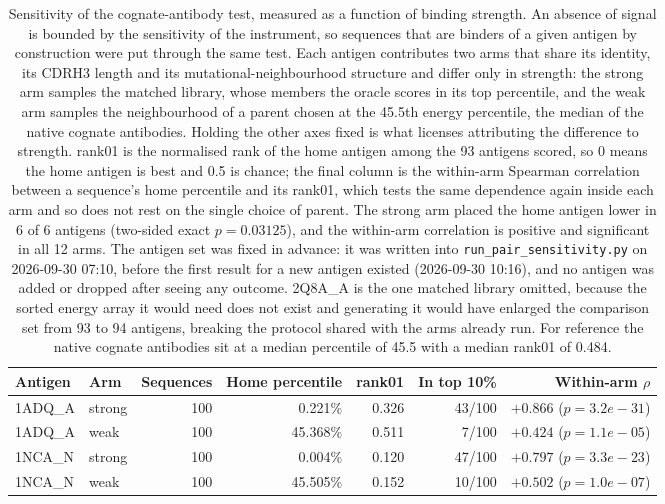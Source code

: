 \documentclass[11pt,a4paper]{article}
\begin{document}
\begin{table}[h]
\caption{Sensitivity of the cognate-antibody test, measured as a function of binding strength. An absence of signal is bounded by the sensitivity of the instrument, so sequences that are binders of a given antigen by construction were put through the same test. Each antigen contributes two arms that share its identity, its CDRH3 length and its mutational-neighbourhood structure and differ only in strength: the strong arm samples the matched library, whose members the oracle scores in its top percentile, and the weak arm samples the neighbourhood of a parent chosen at the 45.5th energy percentile, the median of the native cognate antibodies. Holding the other axes fixed is what licenses attributing the difference to strength. rank01 is the normalised rank of the home antigen among the 93 antigens scored, so 0 means the home antigen is best and 0.5 is chance; the final column is the within-arm Spearman correlation between a sequence's home percentile and its rank01, which tests the same dependence again inside each arm and so does not rest on the single choice of parent. The strong arm placed the home antigen lower in 6 of 6 antigens (two-sided exact $p = 0.03125$), and the within-arm correlation is positive and significant in all 12 arms. The antigen set was fixed in advance: it was written into \texttt{run\_pair\_sensitivity.py} on 2026-09-30 07:10, before the first result for a new antigen existed (2026-09-30 10:16), and no antigen was added or dropped after seeing any outcome. 2Q8A\_A is the one matched library omitted, because the sorted energy array it would need does not exist and generating it would have enlarged the comparison set from 93 to 94 antigens, breaking the protocol shared with the arms already run. For reference the native cognate antibodies sit at a median percentile of 45.5 with a median rank01 of 0.484.}
\centering
\begin{tabular}{@{}llrrrrr@{}}
\toprule
Antigen & Arm & Sequences & Home percentile & rank01 & In top 10\% & Within-arm $\rho$ \\
\midrule
1ADQ\_A & strong & 100 & 0.221\% & 0.326 & 43/100 & $+0.866$ ($p = 3.2e-31$) \\
1ADQ\_A & weak & 100 & 45.368\% & 0.511 & 7/100 & $+0.424$ ($p = 1.1e-05$) \\
1NCA\_N & strong & 100 & 0.004\% & 0.120 & 47/100 & $+0.797$ ($p = 3.3e-23$) \\
1NCA\_N & weak & 100 & 45.505\% & 0.152 & 10/100 & $+0.502$ ($p = 1.0e-07$) \\

\end{tabular}
\end{table}
\end{document}
